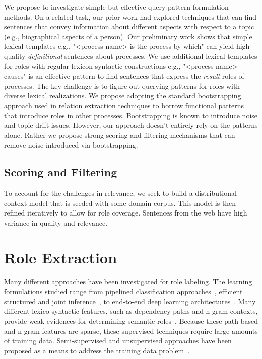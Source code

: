We propose to investigate simple but effective query pattern formulation methods. 
On a related task, our prior work had explored techniques that can find sentences that convey information about different aspects with respect to a topic (e.g., biographical aspects of a person). 
Our preliminary work shows that simple lexical templates e.g., "<process name> is the process by which" can yield high quality {\em definitional} sentences about processes. 
We use additional lexical templates for roles with regular lexicon-syntactic constructions e.g., "<process name> causes" is an effective pattern to find sentences that express the {\em result} roles of processes. The key challenge is to figure out querying patterns for roles with diverse lexical realizations. We propose adopting the standard bootstrapping approach used in relation extraction techniques to borrow functional patterns that introduce roles in other processes. Bootstrapping is known to introduce noise and topic drift issues. However, our approach doesn't entirely rely on the patterns alone. Rather we propose strong scoring and filtering mechanisms that can remove noise introduced via bootstrapping.

\subsection{Scoring and Filtering}

To account for the challenges in relevance, we seek to build a distributional context model that is seeded with some domain corpus. This model is then refined iteratively to allow for role coverage. 
Sentences from the web have high variance in quality and relevance. 

\section{Role Extraction}

Many different approaches have been investigated for role labeling.
The learning formulations studied range from pipelined classification approaches~\cite{gildea2002automatic,bjorkelund2009multilingual}, 
efficient structured and joint inference~\cite{koomen2005generalized,tackstrom2015efficient}, to end-to-end deep learning architectures~\cite{foland2015dependency}.
Many different lexico-syntactic features, such as dependency paths and n-gram contexts, provide weak evidences for determining semantic roles~\cite{gildea2002automatic}. 
Because these path-based and n-gram features are sparse, these supervised techniques require large amounts of training data. 
Semi-supervised and unsupervised approaches have been proposed as a means to address the training data problem~\cite{furstenau-emnlp2009,klementievsemi}.

